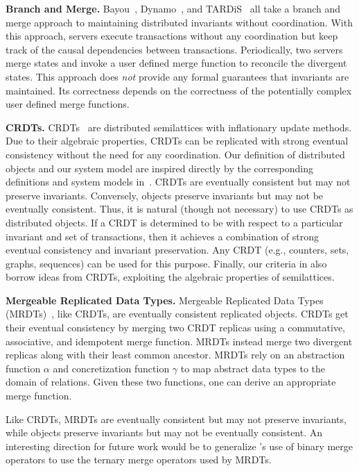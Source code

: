 \textbf{Branch and Merge.}
Bayou~\cite{terry1995managing}, Dynamo~\cite{decandia2007dynamo}, and
TARDiS~\cite{crooks2016tardis} all take a branch and merge approach to
maintaining distributed invariants without coordination. With this approach,
servers execute transactions without any coordination but keep track of the
causal dependencies between transactions. Periodically, two servers merge
states and invoke a user defined merge function to reconcile the divergent
states. This approach does \emph{not} provide any formal guarantees that
invariants are maintained. Its correctness depends on the correctness of the
potentially complex user defined merge functions.

\textbf{CRDTs.}
CRDTs~\cite{shapiro2011conflict, shapiro2011comprehensive} are distributed
semilattices with inflationary update methods. Due to their algebraic
properties, CRDTs can be replicated with strong eventual consistency without
the need for any coordination. Our definition of distributed objects and our
\invariantconfluence{} system model are inspired directly by the corresponding
definitions and system models in~\cite{shapiro2011conflict}.
%
CRDTs are eventually consistent but may not preserve invariants. Conversely,
\invariantconfluent{} objects preserve invariants but may not be eventually
consistent. Thus, it is natural (though not necessary) to use CRDTs as
distributed objects. If a CRDT is determined to be \invariantconfluent{} with
respect to a particular invariant and set of transactions, then it achieves a
combination of strong eventual consistency and invariant preservation. Any CRDT
(e.g., counters, sets, graphs, sequences) can be used for this purpose.
%
Finally, our criteria in  also borrow ideas from CRDTs,
exploiting the algebraic properties of semilattices.

\begin{revisions}
  \textbf{Mergeable Replicated Data Types.}
  Mergeable Replicated Data Types (MRDTs)~\cite{kaki2019mergeable}, like CRDTs,
  are eventually consistent replicated objects. CRDTs get their eventual
  consistency by merging two CRDT replicas using a commutative, associative,
  and idempotent merge function. MRDTs instead merge two divergent replicas
  along with their least common ancestor. MRDTs rely on an abstraction function
  $\alpha$ and concretization function $\gamma$ to map abstract data types to
  the domain of relations. Given these two functions, one can derive an
  appropriate merge function.

  Like CRDTs, MRDTs are eventually consistent but may not preserve invariants,
  while \invariantconfluent{} objects preserve invariants but may not be
  eventually consistent. An interesting direction for future work would be to
  generalize \invariantconfluence{}'s use of binary merge operators to use the
  ternary merge operators used by MRDTs.
\end{revisions}

